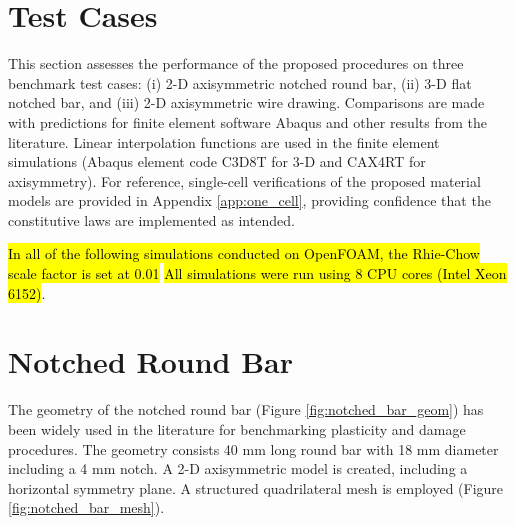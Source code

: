 \documentclass[sn-mathphys,Numbered,draft]{sn-jnl}%
\begin{document}
\section{Test Cases} \label{sec:test_cases}

This section assesses the performance of the proposed procedures on three benchmark test cases: (i) 2-D axisymmetric notched round bar, (ii) 3-D flat notched bar, and (iii) 2-D axisymmetric wire drawing.
Comparisons are made with predictions for finite element software Abaqus and other results from the literature.
Linear interpolation functions are used in the finite element simulations (Abaqus element code C3D8T for 3-D and CAX4RT for axisymmetry).
For reference, single-cell verifications of the proposed material models are provided in Appendix \ref{app:one_cell}, providing confidence that the constitutive laws are implemented as intended.


\hl{In all of the following simulations conducted on OpenFOAM, the Rhie-Chow scale factor is set at 0.01}
\hl{All simulations were run using 8 CPU cores (Intel Xeon 6152)}.


\section{Notched Round Bar}
The geometry of the notched round bar (Figure \ref{fig:notched_bar_geom}) has been widely used in the literature \cite{cesar_de_sa_damage_2006, fincato_return_2018, vaz_aspects_2001} for benchmarking plasticity and damage procedures.
The geometry consists 40 \si{\milli\meter} long round bar with 18 \si{\milli\meter} diameter including a 4 \si{\milli\meter} notch.
A 2-D axisymmetric model is created, including a horizontal symmetry plane.
A structured quadrilateral mesh is employed (Figure \ref{fig:notched_bar_mesh}).
\end{document}
